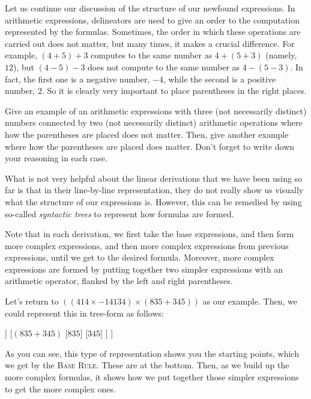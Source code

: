 Let us continue our discussion of the structure of our newfound expressions. In arithmetic expressions, delineators are used to give an order to the computation represented by the formulas. Sometimes, the order in which these operations are carried out does not matter, but many times, it makes a crucial difference. For example, $(4+5)+3$ computes to the same number as $4+(5+3)$ (namely, $12$), but $(4-5)-3$ does not compute to the same number as $4-(5-3)$. In fact, the first one is a negative number, $-4$, while the second is a positive number, $2$. So it is clearly very important to place parentheses in the right places.  

\begin{exc}
Give an example of an arithmetic expressions with three (not necessarily distinct) numbers connected by two (not necessarily distinct) arithmetic operations where how the parentheses are placed does not matter. Then, give another example where how the parentheses are placed does matter. Don't forget to write down your reasoning in each case. 
\end{exc}

What is not very helpful about the linear derivations that we have been using so far is that in their line-by-line representation, they do not really show us visually what the structure of our expressions is. However, this can be remedied by using so-called \textit{syntactic trees} to represent how formulas are formed. 

Note that in each derivation, we first take the base expressions, and then form more complex expressions, and then more complex expressions from previous expressions, until we get to the desired formula. Moreover, more complex expressions are formed by putting together two simpler expressions with an arithmetic operator, flanked by the left and right parentheses. 

Let's return to $((414 \times -14134)\times (835+345))$ as our example. Then, we could represent this in tree-form as follows:

\begin{center}
\begin{forest}
[$((414 \times -14134)\times (835+345))$
	[$(414 \times -14134)$
		[$414$]
		[$-14134$]
	]
	[$(835+345)$
		[$835$]
		[$345$]
	]
]
\end{forest}
\end{center}

As you can see, this type of representation shows you the starting points, which we get by the \textsc{Base Rule}. These are at the bottom. Then, as we build up the more complex formulas, it shows how we put together those simpler expressions to get the more complex ones. 

